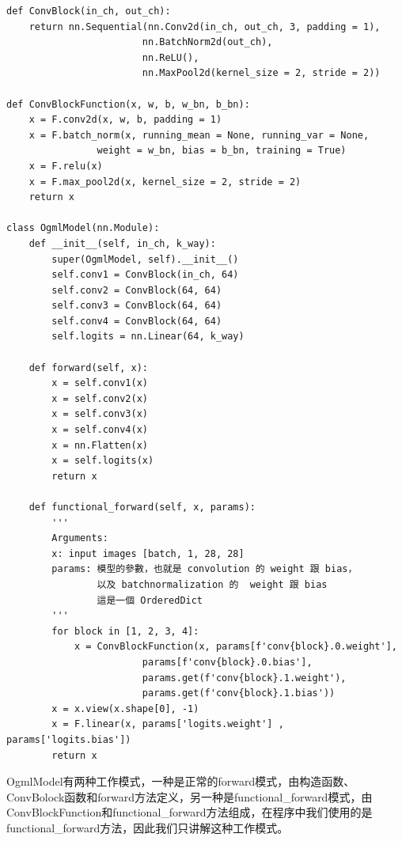 \begin{lstlisting}
def ConvBlock(in_ch, out_ch):
    return nn.Sequential(nn.Conv2d(in_ch, out_ch, 3, padding = 1),
                        nn.BatchNorm2d(out_ch),
                        nn.ReLU(),
                        nn.MaxPool2d(kernel_size = 2, stride = 2))

def ConvBlockFunction(x, w, b, w_bn, b_bn):
    x = F.conv2d(x, w, b, padding = 1)
    x = F.batch_norm(x, running_mean = None, running_var = None, 
                weight = w_bn, bias = b_bn, training = True)
    x = F.relu(x)
    x = F.max_pool2d(x, kernel_size = 2, stride = 2)
    return x

class OgmlModel(nn.Module):
    def __init__(self, in_ch, k_way):
        super(OgmlModel, self).__init__()
        self.conv1 = ConvBlock(in_ch, 64)
        self.conv2 = ConvBlock(64, 64)
        self.conv3 = ConvBlock(64, 64)
        self.conv4 = ConvBlock(64, 64)
        self.logits = nn.Linear(64, k_way)
    
    def forward(self, x):
        x = self.conv1(x)
        x = self.conv2(x)
        x = self.conv3(x)
        x = self.conv4(x)
        x = nn.Flatten(x)
        x = self.logits(x)
        return x

    def functional_forward(self, x, params):
        '''
        Arguments:
        x: input images [batch, 1, 28, 28]
        params: 模型的參數，也就是 convolution 的 weight 跟 bias，
                以及 batchnormalization 的  weight 跟 bias
                這是一個 OrderedDict
        '''
        for block in [1, 2, 3, 4]:
            x = ConvBlockFunction(x, params[f'conv{block}.0.weight'], 
                        params[f'conv{block}.0.bias'],                                 
                        params.get(f'conv{block}.1.weight'), 
                        params.get(f'conv{block}.1.bias'))
        x = x.view(x.shape[0], -1)
        x = F.linear(x, params['logits.weight'] , params['logits.bias'])
        return x
\end{lstlisting}
OgmlModel有两种工作模式，一种是正常的forward模式，由构造函数、ConvBolock函数和forward方法定义，另一种是functional\_forward模式，由ConvBlockFunction和functional\_forward方法组成，在程序中我们使用的是functional\_forward方法，因此我们只讲解这种工作模式。
